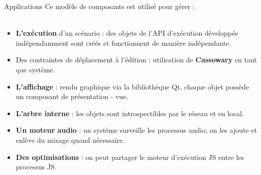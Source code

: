 \begin{block}{Applications}
    Ce modèle de composants est utilisé pour gérer :~\\~\\
    \begin{itemize}
        \item \textbf{L'exécution} d'un scénario : des objets de l'API d'exécution développée indépendamment sont créés et fonctionnent de manière indépendante.
        \item Des contraintes de déplacement à l'édition : utilisation de \textbf{Cassowary} en tant que système.
        \item \textbf{L'affichage} : rendu graphique via la bibliothèque Qt, chaque objet possède un composant de présentation - vue.
        \item \textbf{L'arbre interne} : les objets sont introspectibles par le réseau et en local.
        \item \textbf{Un moteur audio} : un système surveille les processus audio; on les ajoute et enlève du mixage quand nécessaire.
        \item \textbf{Des optimisations} : on peut partager le moteur d'exécution JS entre les processus JS.
    \end{itemize}
\end{block}
